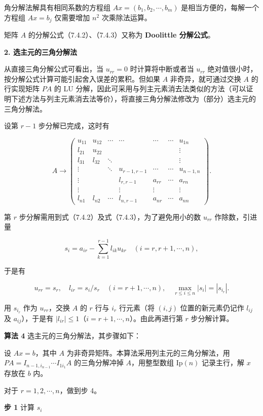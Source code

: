 \documentclass[
  10pt,
  fontset=fandol]{ctexart}
\begin{document}
角分解法解具有相同系数的方程组 \(Ax=(b_1,b_2,\cdots,b_m)\) 是相当方便的，每解一个方程组 \(Ax=b_j\) 仅需要增加 \(n^2\) 次乘除法运算。

矩阵 \(A\) 的分解公式（7.4.2）、（7.4.3）又称为 \textbf{Doolittle 分解公式}。

\textbf{2. 选主元的三角分解法}

从直接三角分解公式可看出，当 \(u_{rr}=0\) 时计算将中断或者当 \(u_{rr}\) 绝对值很小时，按分解公式计算可能引起舍入误差的累积。但如果 \(A\) 非奇异，就可通过交换 \(A\) 的行实现矩阵 \(PA\) 的 LU 分解，因此可采用与列主元素消去法类似的方法（可以证明下述方法与列主元素消去法等价），将直接三角分解法修改为（部分）选主元的三角分解法。

设第 \(r-1\) 步分解已完成，这时有

\[
A\to\begin{pmatrix}
u_{11}&u_{12}&\cdots&\cdots&\cdots&\cdots&u_{1n}\\
l_{21}&u_{22}&&&&&\vdots\\
l_{31}&l_{32}&\ddots&&&&\vdots\\
\vdots&&\ddots&u_{r-1,r-1}&\cdots&\cdots&u_{n-1,n}\\
\vdots&&&l_{r,r-1}&a_{rr}&\cdots&a_{rn}\\
\vdots&&&\vdots&\vdots&&\vdots\\
l_{n1}&l_{n2}&\cdots&l_{n,r-1}&a_{nr}&\cdots&a_{nn}
\end{pmatrix}.
\]

第 \(r\) 步分解需用到式（7.4.2）及式（7.4.3），为了避免用小的数 \(u_{rr}\) 作除数，引进量

\[s_i=a_{ir}-\sum_{k=1}^{r-1}l_{ik}u_{kr}\quad(i=r,r+1,\cdots,n),\]

于是有

\[u_{rr}=s_r,\quad l_{ir}=s_i/s_r\quad(i=r+1,\cdots,n),\quad \max_{r\le i\le n}|s_i|=|s_{i_r}|.\]

用 \(s_{i_r}\) 作为 \(u_{rr}\)，交换 \(A\) 的 \(r\) 行与 \(i_r\) 行元素（将 \((i,j)\) 位置的新元素仍记作 \(l_{ij}\) 及 \(a_{ij}\)），于是有 \(|l_{ir}|\le1\)（\(i=r+1,\cdots,n\)）。由此再进行第 \(r\) 步分解计算。

\textbf{算法 4} 选主元的三角分解法，其步骤如下：

设 \(Ax=b\)，其中 \(A\) 为非奇异矩阵。本算法采用列主元的三角分解法，用 \(PA=I_{n-1,i_{n-1}}\cdots I_{1i_1}A\) 的三角分解冲掉 \(A\)，用整型数组 \(\mathrm{Ip}(n)\) 记录主行，解 \(x\) 存放在 \(b\) 内。

对于 \(r=1,2,\cdots,n\)，做到步 4。

\textbf{步 1} 计算 \(s_i\)
\end{document}
